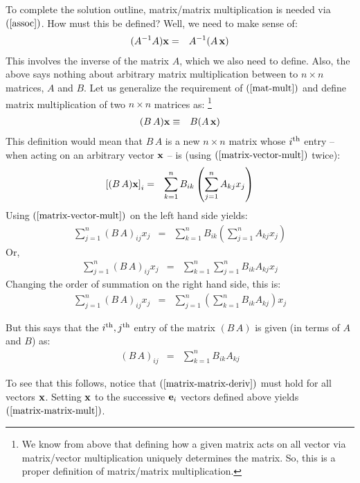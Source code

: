 \documentclass{article}
\begin{document}
To complete the solution outline, matrix/matrix multiplication is needed
via $(\ref{assoc})$. How must this be defined?
Well, we need to make sense of:
\begin{eqnarray}
  (A^{-1} A) {\bf x} & = & A^{-1} (A \, {\bf x}) \label{mat-mult}
\end{eqnarray}
This involves the inverse of the matrix $A$, which we also need to define. Also,
the above says nothing about arbitrary matrix multiplication between to $n \times n$
matrices, $A$ and $B$. Let us generalize the requirement of $(\ref{mat-mult})$
and define matrix multiplication of two $n \times n$ matrices as:%
\footnote{We know from above that defining how a given matrix acts on all vector
  via matrix/vector multiplication uniquely determines the matrix. So, this is a proper definition of matrix/matrix multiplication.}
\begin{eqnarray}
  (B \, A) {\bf x} & \equiv & B (A \, {\bf x})
\end{eqnarray}
This definition would mean that $B \, A$ is a new $n \times n$ matrix whose
$i^{\rm th}$ entry -- when acting on an arbitrary vector ${\bf x}$ --
is (using $(\ref{matrix-vector-mult})$ twice):
\begin{eqnarray}
  \left[(B \, A) {\bf x}\right]_i &  = & \sum_{k=1}^n B_{ik} \left(\sum_{j=1}^n A_{kj} x_j\right)
\end{eqnarray}
Using $(\ref{matrix-vector-mult})$ on the left hand side yields:
\begin{eqnarray}
  \sum_{j=1}^n (B \, A)_{ij} x_j &  = & \sum_{k=1}^n B_{ik} \left(\sum_{j=1}^n A_{kj} x_j\right)
\end{eqnarray}
Or,
\begin{eqnarray}
  \sum_{j=1}^n (B \, A)_{ij} x_j &  = & \sum_{k=1}^n \sum_{j=1}^n B_{ik} A_{kj} x_j
\end{eqnarray}
Changing the order of summation on the right hand side, this is:
\begin{eqnarray}
  \sum_{j=1}^n (B \, A)_{ij} x_j &  = & \sum_{j=1}^n \left(\sum_{k=1}^n B_{ik} A_{kj}\right) x_j \label{matrix-matrix-deriv}
\end{eqnarray}

But this says that the $i^{\rm th}, j^{\rm th}$ entry of the matrix $(B \, A)$ is
given (in terms of $A$ and $B$) as:%
\begin{eqnarray}
  (B \, A)_{ij} & = & \sum_{k=1}^n B_{ik} A_{kj} \label{matrix-matrix-mult}
\end{eqnarray}

To see that this follows, notice that $(\ref{matrix-matrix-deriv})$ must hold for all
vectors ${\bf x}$. Setting ${\bf x}$ to the successive ${\bf e}_i$ vectors defined
above yields $(\ref{matrix-matrix-mult})$.
\end{document}
